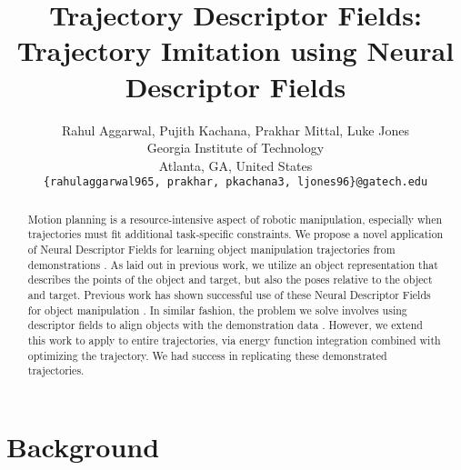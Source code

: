 \documentclass[10pt,twocolumn,letterpaper]{article}
\begin{document}
\title{Trajectory Descriptor Fields: Trajectory Imitation using Neural Descriptor Fields}

\author{Rahul Aggarwal, Pujith Kachana, Prakhar Mittal, Luke Jones\\
Georgia Institute of Technology\\
Atlanta, GA, United States\\
{\tt\small \{rahulaggarwal965, prakhar, pkachana3, ljones96\}@gatech.edu}
}


\maketitle

\begin{abstract}
   Motion planning is a resource-intensive aspect of robotic manipulation, especially when trajectories must fit additional task-specific constraints. We propose a novel application of Neural Descriptor Fields for learning object manipulation trajectories from demonstrations \cite{simeonovdu2021ndf}. As laid out in previous work, we utilize an object representation that describes the points of the object and target, but also the poses relative to the object and target. Previous work has shown successful use of these Neural Descriptor Fields for object manipulation \cite{simeonovdu2021ndf}. In similar fashion, the problem we solve involves using descriptor fields to align objects with the demonstration data \cite{simeonovdu2021ndf}. However, we extend this work to apply to entire trajectories, via energy function integration combined with optimizing the trajectory. We had success in replicating these demonstrated trajectories.
\end{abstract}

\section{Background}
\end{document}
